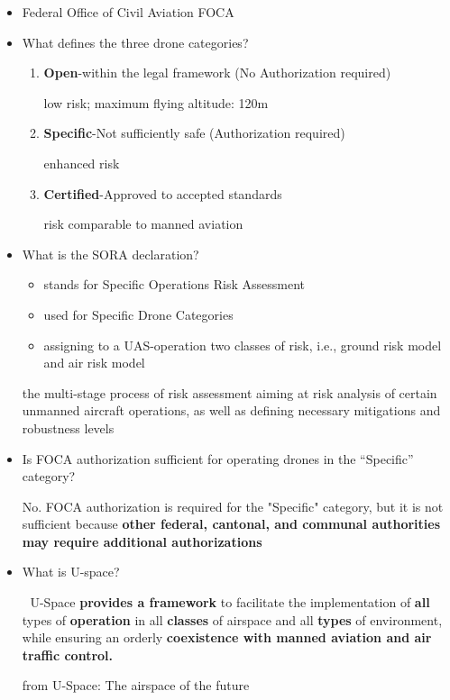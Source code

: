 \documentclass[]{article}
\begin{document}
\begin{itemize}
\item
  Federal Office of Civil Aviation FOCA
\item
  What defines the three drone categories?

  \begin{enumerate}
  \def\labelenumi{\arabic{enumi}.}
  \item
    \textbf{Open}-within the legal framework (No Authorization required)

    low risk; maximum flying altitude: 120m
  \item
    \textbf{Specific}-Not sufficiently safe (Authorization required)

    enhanced risk
  \item
    \textbf{Certified}-Approved to accepted standards

    risk comparable to manned aviation
  \end{enumerate}
\item
  What is the SORA declaration?

  \begin{itemize}
  \item
    stands for Specific Operations Risk Assessment
  \item
    used for Specific Drone Categories
  \item
    assigning to a UAS-operation two classes of risk, i.e., ground risk
    model and air risk model
  \end{itemize}

  the multi-stage process of risk assessment aiming at risk analysis of
  certain unmanned aircraft operations, as well as defining necessary
  mitigations and robustness levels
\item
  Is FOCA authorization sufficient for operating drones in the
  ``Specific'' category?

  No. FOCA authorization is required for the "Specific" category, but it
  is not sufficient because \textbf{other federal, cantonal, and
  communal authorities may require additional authorizations}
\item
  What is U-space?

  🚧 U-Space \textbf{provides a framework} to facilitate the
  implementation of \textbf{all} types of \textbf{operation} in all
  \textbf{classes} of airspace and all \textbf{types} of environment,
  while ensuring an orderly \textbf{coexistence with manned aviation and
  air traffic control.}

  from U-Space: The airspace of the future
\end{itemize}
\end{document}
